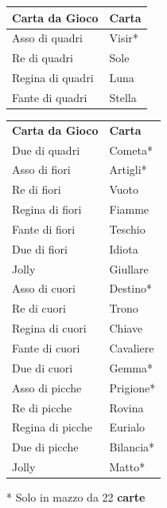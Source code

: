 \begin{multicols}{2}
\noindent\begin{tabularx}{0.48\textwidth}{ll}
	\toprule
\textbf{Carta da Gioco} & \textbf{Carta}\\
\toprule
	Asso di quadri & Visir* \\
	Re di quadri & Sole \\
	Regina di quadri & Luna \\
	Fante di quadri & Stella \\
\end{tabularx}
\noindent\begin{tabularx}{0.48\textwidth}{ll}
	\textbf{Carta da Gioco} & \textbf{Carta}\\
	Due di quadri & Cometa* \\
	Asso di fiori & Artigli* \\
	Re di fiori & Vuoto \\
	Regina di fiori & Fiamme \\
	Fante di fiori & Teschio \\
	Due di fiori & Idiota \\
	Jolly & Giullare \\
	Asso di cuori & Destino* \\
	Re di cuori & Trono \\
	Regina di cuori & Chiave \\
	Fante di cuori & Cavaliere \\
	Due di cuori & Gemma* \\
	Asso di picche & Prigione* \\
	Re di picche & Rovina \\
	Regina di picche & Eurialo \\
	Due di picche & Bilancia* \\
	Jolly & Matto* \\
	\end{tabularx}

\medskip

* Solo in mazzo da 22 \textbf{carte}


\end{multicols}
